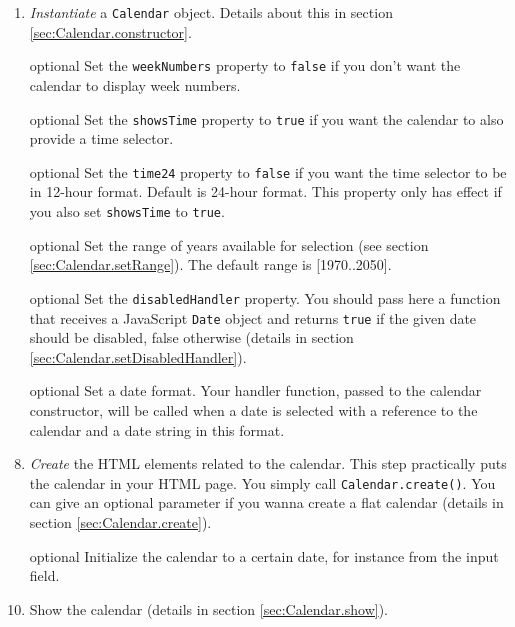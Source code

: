 \documentclass[a4paper,10pt]{article}
\begin{document}
\begin{enumerate}

\item \emph{Instantiate} a \texttt{Calendar} object.  Details about this in
section \ref{sec:Calendar.constructor}.

\item [optional] Set the \texttt{weekNumbers} property to \texttt{false} if you don't want
the calendar to display week numbers.

\item [optional] Set the \texttt{showsTime} property to \texttt{true} if you
want the calendar to also provide a time selector.

\item [optional] Set the \texttt{time24} property to \texttt{false} if you want
the time selector to be in 12-hour format.  Default is 24-hour format.  This
property only has effect if you also set \texttt{showsTime} to
\texttt{true}.

\item [optional] Set the range of years available for selection (see section
\ref{sec:Calendar.setRange}).  The default range is [1970..2050].

\item [optional] Set the \texttt{disabledHandler} property.  You should pass
here a function that receives a JavaScript \texttt{Date} object and returns
\texttt{true} if the given date should be disabled, false otherwise (details in
section \ref{sec:Calendar.setDisabledHandler}).

\item [optional] Set a date format.  Your handler function, passed to the
calendar constructor, will be called when a date is selected with a reference
to the calendar and a date string in this format.

\item \emph{Create} the HTML elements related to the calendar.  This step
practically puts the calendar in your HTML page.  You simply call
\texttt{Calendar.create()}.  You can give an optional parameter if you wanna
create a flat calendar (details in section \ref{sec:Calendar.create}).

\item [optional] Initialize the calendar to a certain date, for instance from
the input field.

\item Show the calendar (details in section \ref{sec:Calendar.show}).

\end{enumerate}
\end{document}
